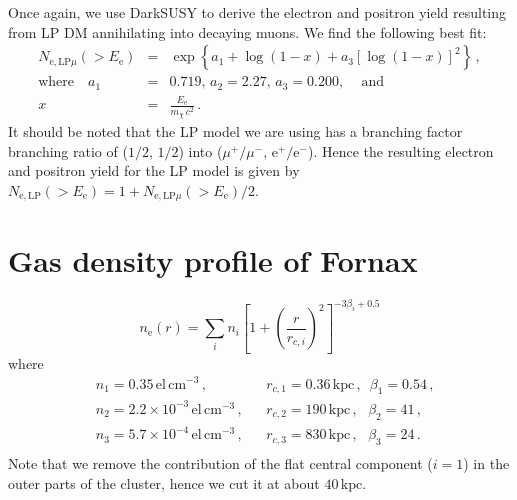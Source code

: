 \documentclass[10pt,aps,pra,reprint,amsmath,amsfonts,amssymb,showpacs,nofootinbib,floatfix]{revtex4-1}
\newcommand{\rmn}{\mathrm}
\newcommand{\ee}{E_\rmn{e}}
\newcommand{\kpc}{\rmn{kpc}}
\newcommand{\e}{\rmn{e}}
\begin{document}
Once again, we use {\sc DarkSUSY} to derive the electron and positron
yield resulting from LP DM annihilating into decaying muons. We find
the following best fit:
\begin{eqnarray}
N_{\e,\rmn{LP}\mu}(>\ee) &=& \exp\left\{a_1+\log\left(1-x\right)+
a_3\left[\log\left(1-x\right)\right]^2\right\}
\,,\nonumber\\
\rmn{where}\quad a_1&=&0.719,\,a_2=2.27,\,a_3=0.200,\,\quad\rmn{and}\nonumber\\
x&=&\frac{\ee}{m_\chi\,c^2}\,.
\label{eq:bm_elec}
\end{eqnarray}
It should be noted that the LP model we are using has a branching
factor branching ratio of ($1/2,\,1/2$) into
($\mu^+/\mu^-,\,\e^+/\e^-$). Hence the resulting electron and positron
yield for the LP model is given by $N_{\e,\rmn{LP}}(>\ee) =
1+N_{\e,\rmn{LP}\mu}(>\ee)/2$.



\section{Gas density profile of Fornax}

\begin{equation}
n_\e(r) = \sum_i n_i\left[1+\left(\frac{r}{r_{c,i}}\right)^2\right]^{-3\beta_i+0.5}
\end{equation}
where
\begin{align}
&n_1 = 0.35\, \rmn{el}\,\rmn{cm}^{-3}\,,
&&r_{c,1} = 0.36\,\kpc\,,\,\,\,
\beta_1 = 0.54\,, \nonumber\\
&n_2 = 2.2\times10^{-3}\,\rmn{el}\,\rmn{cm}^{-3}\,,
&&r_{c,2} = 190\,\kpc\,,\,\,\,\,
\beta_2 = 41\,, \nonumber\\
&n_3 = 5.7\times10^{-4}\,\rmn{el}\,\rmn{cm}^{-3}\,,
&&r_{c,3} = 830\,\kpc\,,\,\,\,\,
\beta_3 = 24\,. \nonumber\\
& &&
\label{fit_fornax}
\end{align}
Note that we remove the contribution of the flat central component
($i=1$) in the outer parts of the cluster, hence we cut it at about
$40\,\kpc$.
\end{document}
